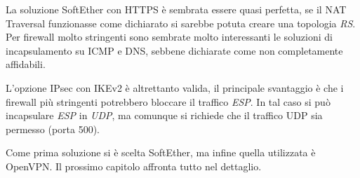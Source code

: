 La soluzione SoftEther con HTTPS è sembrata essere quasi perfetta, se il NAT Traversal
funzionasse come dichiarato si sarebbe potuta creare una topologia \textit{RS}.
Per firewall molto stringenti sono sembrate molto interessanti le soluzioni di incapsulamento
su ICMP  e DNS, sebbene dichiarate come non completamente affidabili.

L'opzione IPsec con IKEv2 è altrettanto valida, il principale svantaggio è che i firewall più stringenti
potrebbero bloccare il traffico \textit{ESP}. In tal caso si può incapsulare \textit{ESP} in \textit{UDP},
ma comunque si richiede che il traffico UDP sia permesso (porta 500).

Come prima soluzione si è scelta SoftEther, ma infine quella utilizzata è OpenVPN. Il
prossimo capitolo affronta tutto nel dettaglio.
